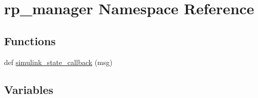 \hypertarget{namespacerp__manager}{}\section{rp\+\_\+manager Namespace Reference}
\label{namespacerp__manager}
\subsection*{Functions}
\begin{DoxyCompactItemize}
\item 
def \hyperlink{namespacerp__manager_a12d1e048fb6f0fcabb8e81c26f042ed5}{simulink\+\_\+state\+\_\+callback} (msg)
\end{DoxyCompactItemize}
\subsection*{Variables}
